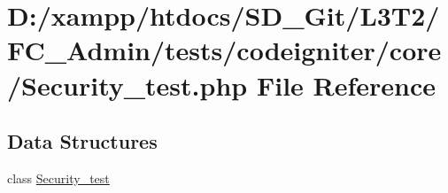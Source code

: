 \hypertarget{_admin_2tests_2codeigniter_2core_2_security__test_8php}{}\section{D\+:/xampp/htdocs/\+S\+D\+\_\+\+Git/\+L3\+T2/\+F\+C\+\_\+\+Admin/tests/codeigniter/core/\+Security\+\_\+test.php File Reference}
\label{_admin_2tests_2codeigniter_2core_2_security__test_8php}
\subsection*{Data Structures}
\begin{DoxyCompactItemize}
\item 
class \hyperlink{class_security__test}{Security\+\_\+test}
\end{DoxyCompactItemize}
